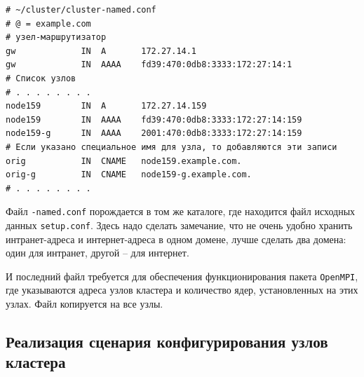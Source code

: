 \documentclass[12pt]{article}
\begin{document}
\begin{verbatim}
# ~/cluster/cluster-named.conf
# @ = example.com
# узел-маршрутизатор
gw             IN  A       172.27.14.1
gw             IN  AAAA    fd39:470:0db8:3333:172:27:14:1
# Список узлов
# . . . . . . . .
node159        IN  A       172.27.14.159
node159        IN  AAAA    fd39:470:0db8:3333:172:27:14:159
node159-g      IN  AAAA    2001:470:0db8:3333:172:27:14:159
# Если указано специальное имя для узла, то добавляются эти записи
orig           IN  CNAME   node159.example.com.
orig-g         IN  CNAME   node159-g.example.com.
# . . . . . . . .
\end{verbatim}
Файл \texttt{-named.conf} порождается в том же каталоге, где находится файл исходных данных \texttt{setup.conf}. Здесь надо сделать замечание, что не очень удобно хранить интранет-адреса и интернет-адреса в одном домене, лучше сделать два домена: один для интранет, другой -- для интернет.

И последний файл требуется для обеспечения функционирования пакета \texttt{OpenMPI}, где указываются адреса узлов кластера и количество ядер, установленных на этих узлах. Файл копируется на все узлы.

\subsection{Реализация сценария конфигурирования узлов кластера}
\end{document}
